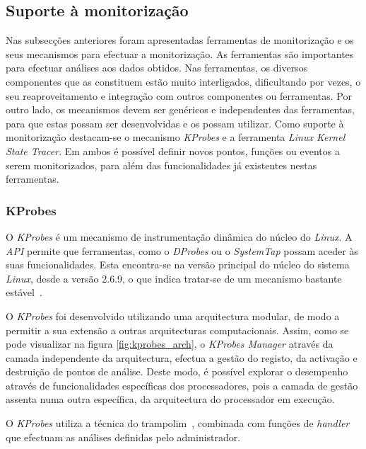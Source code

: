 \subsection{Suporte à monitorização}

Nas subsecções anteriores foram apresentadas ferramentas de monitorização e os seus mecanismos para efectuar a monitorização.
As ferramentas são importantes para efectuar análises aos dados obtidos.
Nas ferramentas, os diversos componentes que as constituem estão muito interligados, dificultando por vezes, o seu reaproveitamento e integração com outros componentes ou ferramentas.
Por outro lado, os mecanismos devem ser genéricos e independentes das ferramentas, para que estas possam ser desenvolvidas e os possam utilizar.
Como suporte à monitorização destacam-se o mecanismo \textit{KProbes} e a ferramenta \textit{Linux Kernel State Tracer}.
Em ambos é possível definir novos pontos, funções ou eventos a serem monitorizados, para além das funcionalidades já existentes nestas ferramentas.

\subsubsection{KProbes}\label{sect:KProbes_overview}

O \textit{KProbes} é um mecanismo de instrumentação dinâmica do núcleo do \textit{Linux}.
A \textit{API} permite que ferramentas, como o \textit{DProbes} ou o \textit{SystemTap} possam aceder às suas funcionalidades.
Esta encontra-se na versão principal do núcleo do sistema \textit{Linux}, desde a versão 2.6.9, o que indica tratar-se de um mecanismo bastante estável~\cite{kernel_debug_printk_on_fly,KProbesSite}.

O \textit{KProbes} foi desenvolvido utilizando uma arquitectura modular, de modo a permitir a sua extensão a outras arquitecturas computacionais.
Assim, como se pode visualizar na figura \ref{fig:kprobes_arch}, o \textit{KProbes Manager} através da camada independente da arquitectura, efectua a gestão do registo, da activação e destruição de pontos de análise.
Deste modo, é possível explorar o desempenho através de funcionalidades específicas dos processadores, pois a camada de gestão assenta numa outra específica, da arquitectura do processador em execução.

O \textit{KProbes} utiliza a técnica do trampolim~\cite{Hollingsworth94dynamicprogram}, combinada com funções de \textit{handler} que efectuam as análises definidas pelo administrador.

